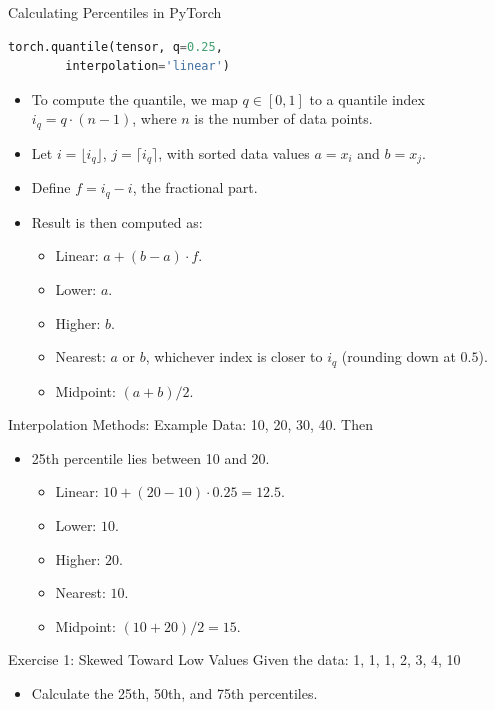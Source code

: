 \documentclass{beamer}
\begin{document}
\begin{frame}[fragile]{Calculating Percentiles in PyTorch}
\begin{lstlisting}[language=python]
torch.quantile(tensor, q=0.25,
        interpolation='linear')
\end{lstlisting}
\begin{itemize}
  \item To compute the quantile, we map \( q \in [0, 1] \) to a quantile index \( i_q = q \cdot (n - 1) \), where \( n \) is the number of data points.
  \item Let \( i = \lfloor i_q \rfloor \), \( j = \lceil i_q \rceil \), with sorted data values \( a = x_i \) and \( b = x_j \).
  \item Define \( f = i_q - i \), the fractional part.
  \item Result is then computed as:
  \begin{itemize}
    \item Linear: \( a + (b - a) \cdot f \).
    \item Lower: \( a \).
    \item Higher: \( b \).
    \item Nearest: \( a \) or \( b \), whichever index is closer to \( i_q \) (rounding down at \( 0.5 \)).
    \item Midpoint: \( (a + b)/2 \).
  \end{itemize}
\end{itemize}
\end{frame}
\begin{frame}{Interpolation Methods: Example}
Data: 10, 20, 30, 40. Then

\begin{itemize}
  \item 25th percentile lies between 10 and 20.
  \begin{itemize}
    \item Linear: \( 10 + (20 - 10) \cdot 0.25 = 12.5 \).
    \item Lower: \( 10 \).
    \item Higher: \( 20 \).
    \item Nearest: \( 10 \).
    \item Midpoint: \( (10 + 20)/2 = 15 \).
  \end{itemize}
\end{itemize}
\end{frame}

\begin{frame}{Exercise 1: Skewed Toward Low Values}
Given the data: 1, 1, 1, 2, 3, 4, 10

\begin{itemize}
  \item Calculate the 25th, 50th, and 75th percentiles.
\end{itemize}
\end{frame}
\end{document}
